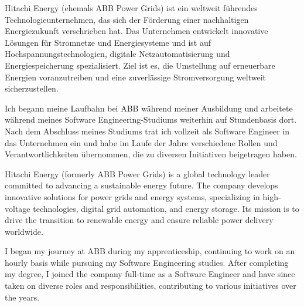 
{
}


\begin{cvparagraph}
	{
		Hitachi Energy (ehemals ABB Power Grids) ist ein weltweit führendes Technologieunternehmen, das sich der Förderung einer nachhaltigen Energiezukunft verschrieben hat. Das Unternehmen entwickelt innovative Lösungen für Stromnetze und Energiesysteme und ist auf Hochspannungstechnologien, digitale Netzautomatisierung und Energiespeicherung spezialisiert. Ziel ist es, die Umstellung auf erneuerbare Energien voranzutreiben und eine zuverlässige Stromversorgung weltweit sicherzustellen.
		
		Ich begann meine Laufbahn bei ABB während meiner Ausbildung und arbeitete während meines Software Engineering-Studiums weiterhin auf Stundenbasis dort. Nach dem Abschluss meines Studiums trat ich vollzeit als Software Engineer in das Unternehmen ein und habe im Laufe der Jahre verschiedene Rollen und Verantwortlichkeiten übernommen, die zu diversen Initiativen beigetragen haben.
	}
	{
		Hitachi Energy (formerly ABB Power Grids) is a global technology leader committed to advancing a sustainable energy future. The company develops innovative solutions for power grids and energy systems, specializing in high-voltage technologies, digital grid automation, and energy storage. Its mission is to drive the transition to renewable energy and ensure reliable power delivery worldwide.
		
		I began my journey at ABB during my apprenticeship, continuing to work on an hourly basis while pursuing my Software Engineering studies. After completing my degree, I joined the company full-time as a Software Engineer and have since taken on diverse roles and responsibilities, contributing to various initiatives over the years.
}
\end{cvparagraph}

